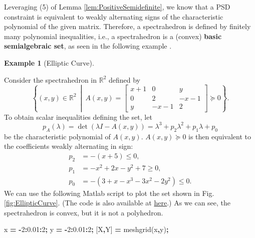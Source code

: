 \documentclass[
]{book}
\newenvironment{Shaded}{\begin{snugshade}}{\end{snugshade}}
\newcommand{\FloatTok}[1]{\textcolor[rgb]{0.00,0.00,0.81}{#1}}
\newcommand{\NormalTok}[1]{#1}
\newcommand{\OperatorTok}[1]{\textcolor[rgb]{0.81,0.36,0.00}{\textbf{#1}}}
\newcommand{\VariableTok}[1]{\textcolor[rgb]{0.00,0.00,0.00}{#1}}
\theoremstyle{definition}
\theoremstyle{definition}
\newtheorem{example}{Example}[chapter]
\theoremstyle{definition}
\theoremstyle{definition}
\theoremstyle{remark}
\begin{document}
Leveraging (5) of Lemma \ref{lem:PositiveSemidefinite}, we know that a PSD constraint is equivalent to weakly alternating signs of the characteristic polynomial of the given matrix. Therefore, a spectrahedron is defined by finitely many polynomial inequalities, i.e., a spectrahedron is a (convex) \textbf{basic semialgebraic set}, as seen in the following example \citep{blekherman12book-semidefinite}.

\begin{example}[Elliptic Curve]
\protect\hypertarget{exm:EllipticCurve}{}\label{exm:EllipticCurve}

Consider the spectrahedron in \(\mathbb{R}^{2}\) defined by
\[
 \left\{ (x,y) \in \mathbb{R}^{2} \ \middle\vert\ A(x,y) = \begin{bmatrix} x+1 & 0 & y \\ 0 & 2 & -x-1 \\ y & -x-1 & 2 \end{bmatrix} \succeq 0  \right\} .
\]
To obtain scalar inequalities defining the set, let
\[
p_A(\lambda) = \det (\lambda I - A(x,y)) = \lambda^3 + p_2 \lambda^2 + p_1 \lambda + p_0
\]
be the characteristic polynomial of \(A(x,y)\). \(A(x,y) \succeq 0\) is then equivalent to the coefficients weakly alternating in sign:
\begin{equation}
\begin{split}
p_2 & = -(x+5) \leq 0, \\
p_1 & = -x^2 + 2x - y^2 + 7 \geq 0, \\
p_0 & = -(3+ x -x^3 -3x^2 - 2y^2) \leq 0.
\end{split}
\end{equation}
We can use the following Matlab script to plot the set shown in Fig. \ref{fig:EllipticCurve}. (The code is also available at \href{https://github.com/ComputationalRobotics/Semidefinite-Examples}{here}.) As we can see, the spectrahedron is convex, but it is not a polyhedron.

\begin{Shaded}
\begin{Highlighting}[]
\VariableTok{x} \OperatorTok{=} \OperatorTok{{-}}\FloatTok{2}\OperatorTok{:}\FloatTok{0.01}\OperatorTok{:}\FloatTok{2}\OperatorTok{;} 
\VariableTok{y} \OperatorTok{=} \OperatorTok{{-}}\FloatTok{2}\OperatorTok{:}\FloatTok{0.01}\OperatorTok{:}\FloatTok{2}\OperatorTok{;} 
\NormalTok{[}\VariableTok{X}\OperatorTok{,}\VariableTok{Y}\NormalTok{] }\OperatorTok{=} \VariableTok{meshgrid}\NormalTok{(}\VariableTok{x}\OperatorTok{,}\VariableTok{y}\NormalTok{)}\OperatorTok{;}


\end{Highlighting}
\end{Shaded}
\end{example}
\end{document}
